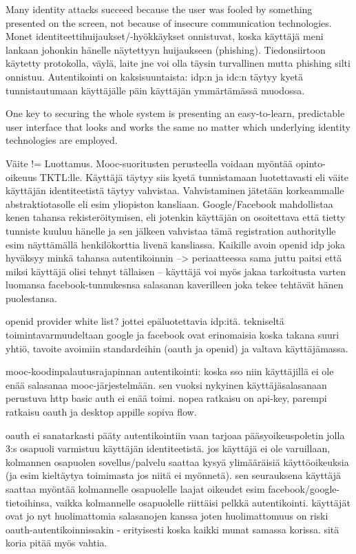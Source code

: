 \documentclass[finnish,gradu]{tktltiki}
\begin{document}
  Many identity attacks succeed because the user was fooled by something presented on the screen, not because of insecure  communication technologies. Monet identiteettihuijaukset/-hyökkäykset onnistuvat, koska käyttäjä meni lankaan johonkin hänelle näytettyyn huijaukseen (phishing). Tiedonsiirtoon käytetty protokolla, väylä, laite jne voi olla täysin turvallinen mutta phishing silti onnistuu. Autentikointi on kaksisuuntaista: idp:n ja idc:n täytyy kyetä tunnistautumaan käyttäjälle päin käyttäjän ymmärtämässä muodossa.

  One key to securing the whole system is presenting an easy-to-learn, predictable user interface that looks and works the same no matter which underlying identity technologies are employed.

  Väite != Luottamus. Mooc-suoritusten perusteella voidaan myöntää opinto-oikeuus TKTL:lle. Käyttäjä täytyy siis kyetä tunnistamaan luotettavasti eli väite käyttäjän identiteetistä täytyy vahvistaa. Vahvistaminen jätetään korkeammalle abstraktiotasolle eli esim yliopiston kansliaan. Google/Facebook mahdollistaa kenen tahansa rekisteröitymisen, eli jotenkin käyttäjän on osoitettava että tietty tunniste kuuluu hänelle ja sen jälkeen vahvistaa tämä registration authoritylle esim näyttämällä henkilökorttia livenä kansliassa. Kaikille avoin openid idp joka hyväksyy minkä tahansa autentikoinnin --> periaatteessa sama juttu paitsi että miksi käyttäjä olisi tehnyt tällaisen -- käyttäjä voi myös jakaa tarkoitusta varten luomansa facebook-tunnukesnsa salasanan kaverilleen joka tekee tehtävät hänen puolestansa.

  openid provider white list? jottei epäluotettavia idp:itä.
  tekniseltä toimintavarmuudeltaan google ja facebook ovat erinomaisia koska takana suuri yhtiö, tavoite avoimiin standardeihin (oauth ja openid) ja valtava käyttäjämassa.

  mooc-koodinpalautusrajapinnan autentikointi: koska sso niin käyttäjillä ei ole enää salasanaa mooc-järjestelmään. sen vuoksi nykyinen käyttäjäsalasanaan perustuva http basic auth ei enää toimi. nopea ratkaisu on api-key, parempi ratkaisu oauth ja desktop appille sopiva flow.

  oauth ei sanatarkasti pääty autentikointiin vaan tarjoaa pääsyoikeuspoletin jolla 3:s osapuoli varmistuu käyttäjän identiteetistä. jos käyttäjä ei ole varuillaan, kolmannen osapuolen sovellus/palvelu saattaa kysyä ylimääräisiä käyttöoikeuksia (ja esim kieltäytya toimimasta jos niitä ei myönnetä). sen seurauksena käyttäjä saattaa myöntää kolmannelle osapuolelle laajat oikeudet esim facebook/google-tietoihinsa, vaikka kolmannelle osapuolelle riittäisi pelkkä autentikointi. käyttäjät ovat jo nyt huolimattomia salasanojen kanssa joten huolimattomuus on riski oauth-autentikoinnissakin - erityisesti koska kaikki munat samassa korissa. sitä koria pitää myös vahtia.
\end{document}
